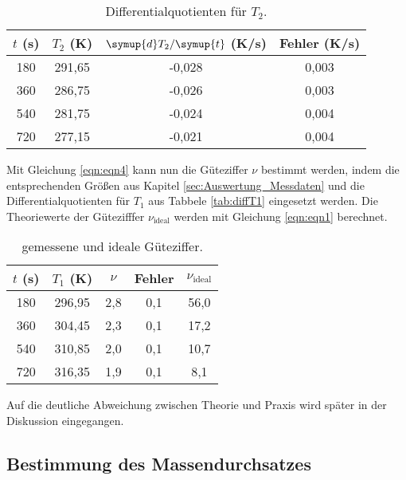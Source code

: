 \begin{table}
  \centering
  \caption{Differentialquotienten für $T_2$.}
  \label{tab:diffT2}
  \begin{tabular}{c c c c}
    \toprule
    $t$ (s) & $T_2$ (K) & $\symup{d}T_2/\symup{t}$ (K/s) & Fehler (K/s) \\
    \midrule
    180 & 291,65 & -0,028 & 0,003 \\
    360 & 286,75 & -0,026 & 0,003 \\
    540 & 281,75 & -0,024 & 0,004 \\
    720 & 277,15 & -0,021 & 0,004 \\
    \bottomrule
  \end{tabular}
\end{table}
\FloatBarrier
Mit Gleichung \eqref{eqn:eqn4} kann nun die Güteziffer $\nu$ bestimmt werden, indem die entsprechenden Größen aus Kapitel \ref{sec:Auswertung_Messdaten} und die Differentialquotienten für $T_1$ aus Tabbele \ref{tab:diffT1} eingesetzt werden.
Die Theoriewerte der Gütezifffer $\nu_{\text{ideal}}$ werden mit Gleichung \eqref{eqn:eqn1} berechnet.
\begin{table}
  \centering
  \caption{gemessene und ideale Güteziffer.}
  \label{tab:guete}
  \begin{tabular}{c c c c c}
    \toprule
    $t$ (s) & $T_1$ (K) & $\nu$ & Fehler & $\nu_{\text{ideal}}$  \\
    \midrule
    180 & 296,95 & 2,8 & 0,1 & 56,0 \\
    360 & 304,45 & 2,3 & 0,1 & 17,2 \\
    540 & 310,85 & 2,0 & 0,1 & 10,7 \\
    720 & 316,35 & 1,9 & 0,1 &  8,1 \\
    \bottomrule
  \end{tabular}
\end{table}
Auf die deutliche Abweichung zwischen Theorie und Praxis wird später in der Diskussion eingegangen.
\FloatBarrier

\subsection{Bestimmung des Massendurchsatzes}
\label{sec:Auswertung_Massendurchsatz}

